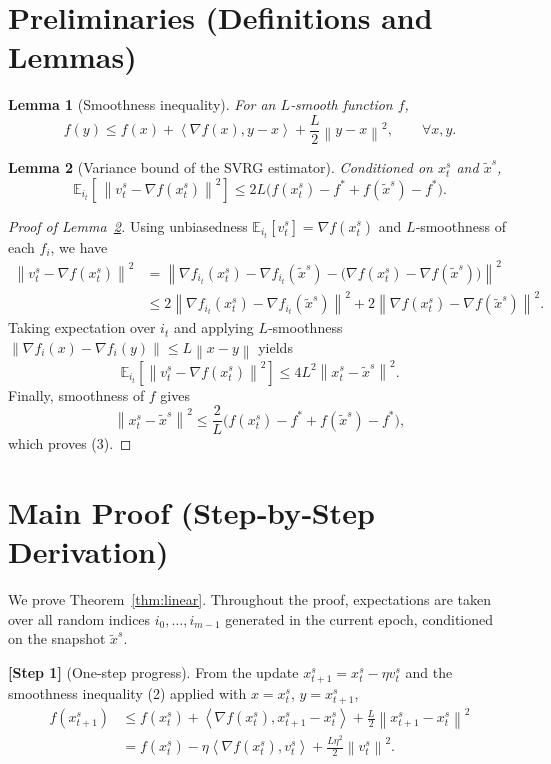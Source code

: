 \documentclass[11pt]{article}
\newtheorem{lemma}{Lemma}
\newcommand{\E}{\mathbb{E}}
\newcommand{\norm}[1]{\left\|#1\right\|}
\newcommand{\inner}[2]{\left\langle #1,#2\right\rangle}
\begin{document}
\newpage
\section*{Preliminaries (Definitions and Lemmas)}
\begin{lemma}[Smoothness inequality]\label{lem:smooth}
For an $L$‑smooth function $f$,
\[
    f(y)\le f(x)+\inner{\nabla f(x)}{y-x}+\frac{L}{2}\norm{y-x}^{2},
    \qquad\forall x,y.
\tag{2}
\]
\end{lemma}
\begin{lemma}[Variance bound of the SVRG estimator]\label{lem:var}
Conditioned on $x_{t}^{s}$ and $\tilde{x}^{s}$,
\[
    \E_{i_t}\!\left[\,\norm{v_t^{s}-\nabla f(x_{t}^{s})}^{2}\right]
    \le 2L\bigl(f(x_{t}^{s})-f^{*}+f(\tilde{x}^{s})-f^{*}\bigr).
\tag{3}
\]
\end{lemma}
\begin{proof}[Proof of Lemma~\ref{lem:var}]
Using unbiasedness $\E_{i_t}[v_t^{s}]=\nabla f(x_{t}^{s})$ and $L$‑smoothness of each $f_i$, we have
\[
\begin{aligned}
\norm{v_t^{s}-\nabla f(x_{t}^{s})}^{2}
    &=\norm{\nabla f_{i_t}(x_{t}^{s})-\nabla f_{i_t}(\tilde{x}^{s})
          -\bigl(\nabla f(x_{t}^{s})-\nabla f(\tilde{x}^{s})\bigr)}^{2}\\
    &\le 2\norm{\nabla f_{i_t}(x_{t}^{s})-\nabla f_{i_t}(\tilde{x}^{s})}^{2}
        +2\norm{\nabla f(x_{t}^{s})-\nabla f(\tilde{x}^{s})}^{2}.
\end{aligned}
\]
Taking expectation over $i_t$ and applying $L$‑smoothness
$\norm{\nabla f_i(x)-\nabla f_i(y)}\le L\norm{x-y}$ yields
\[
\E_{i_t}\!\left[\norm{v_t^{s}-\nabla f(x_{t}^{s})}^{2}\right]
    \le 4L^{2}\norm{x_{t}^{s}-\tilde{x}^{s}}^{2}.
\]
Finally, smoothness of $f$ gives
\[
    \norm{x_{t}^{s}-\tilde{x}^{s}}^{2}\le\frac{2}{L}\bigl(f(x_{t}^{s})-f^{*}+f(\tilde{x}^{s})-f^{*}\bigr),
\]
which proves (3). \qedhere
\end{proof}

\section*{Main Proof (Step‑by‑Step Derivation)}
We prove Theorem~\ref{thm:linear}. Throughout the proof, expectations are taken over all random indices $i_{0},\dots,i_{m-1}$ generated in the current epoch, conditioned on the snapshot $\tilde{x}^{s}$.

\bigskip
\noindent\textbf{[Step 1]} (One‑step progress).  
From the update $x_{t+1}^{s}=x_{t}^{s}-\eta v_{t}^{s}$ and the smoothness inequality (2) applied with $x=x_{t}^{s}$, $y=x_{t+1}^{s}$,
\[
\begin{aligned}
f(x_{t+1}^{s})
    &\le f(x_{t}^{s})+\inner{\nabla f(x_{t}^{s})}{x_{t+1}^{s}-x_{t}^{s}}
        +\frac{L}{2}\norm{x_{t+1}^{s}-x_{t}^{s}}^{2}  \\
    & = f(x_{t}^{s})-\eta\inner{\nabla f(x_{t}^{s})}{v_{t}^{s}}
        +\frac{L\eta^{2}}{2}\norm{v_{t}^{s}}^{2}.
\end{aligned}
\tag{4}
\]
\end{document}
